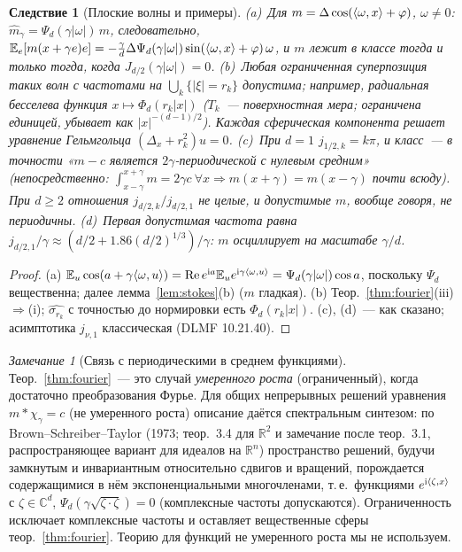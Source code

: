 \documentclass[11pt,a4paper]{article}
\numberwithin{equation}{section}
\newtheorem{corollary}[theorem]{Следствие}
\theoremstyle{definition}
\theoremstyle{remark}
\newtheorem{remark}[theorem]{Замечание}
\newcommand{\E}{\mathbb E}\newcommand{\R}{\mathbb R}\newcommand{\N}{\mathbb N}\let\Prob\relax\newcommand{\Prob}{\mathbb P}
\begin{document}
\begin{corollary}[Плоские волны и примеры]\label{cor:waves}
(a)~Для $m=\Delta\cos(\langle \omega,x\rangle+\varphi)$, $\omega\ne0$: $\hat m_\gamma=\Psi_d(\gamma|\omega|)\,m$, следовательно, $\E_e[m(x+\gamma e)e]=-\frac\gamma d\Delta\Psi_d(\gamma|\omega|)\sin(\ip\omega x+\varphi)\,\omega$, и $m$ лежит в классе тогда и только тогда, когда $J_{d/2}(\gamma|\omega|)=0$.
(b)~Любая ограниченная суперпозиция таких волн с частотами на $\bigcup_k\{|\xi|=r_k\}$ допустима; например, радиальная бесселева функция $x\mapsto\Phi_d(r_k|x|)$ ($T_k$~--- поверхностная мера; ограничена единицей, убывает как $|x|^{-(d-1)/2}$). Каждая сферическая компонента решает уравнение Гельмгольца $(\Delta_x+r_k^2)u=0$.
(c)~При $d=1$ $j_{1/2,k}=k\pi$, и класс~--- в точности «$m-c$ является $2\gamma$-периодической с нулевым средним» (непосредственно: $\int_{x-\gamma}^{x+\gamma}m=2\gamma c\ \forall x\Rightarrow m(x+\gamma)=m(x-\gamma)$ почти всюду). При $d\ge2$ отношения $j_{d/2,k}/j_{d/2,1}$ не целые, и допустимые $m$, вообще говоря, не периодичны.
(d)~Первая допустимая частота равна $j_{d/2,1}/\gamma\approx(d/2+1.86(d/2)^{1/3})/\gamma$: $m$ осциллирует на масштабе $\gamma/d$.
\end{corollary}
\begin{proof}
(a) $\E_u\cos(a+\gamma\ip\omega u)=\mathrm{Re}\,e^{\mathrm ia}\E_ue^{\mathrm i\gamma\ip\omega u}=\Psi_d(\gamma|\omega|)\cos a$, поскольку $\Psi_d$ вещественна; далее лемма~\ref{lem:stokes}(b) ($m$ гладкая). (b) Теор.~\ref{thm:fourier}(iii)$\Rightarrow$(i); $\widehat{\sigma_{r_k}}$ с точностью до нормировки есть $\Phi_d(r_k|x|)$. (c), (d)~--- как сказано; асимптотика $j_{\nu,1}$ классическая (DLMF 10.21.40).
\end{proof}

\begin{remark}[Связь с периодическими в среднем функциями]
Теор.~\ref{thm:fourier}~--- это случай \emph{умеренного роста} (ограниченный), когда достаточно преобразования Фурье. Для общих непрерывных решений уравнения $m*\chi_\gamma=c$ (не умеренного роста) описание даётся спектральным синтезом: по Brown--Schreiber--Taylor (1973; теор.~3.4 для $\R^2$ и замечание после теор.~3.1, распространяющее вариант для идеалов на $\R^n$) пространство решений, будучи замкнутым и инвариантным относительно сдвигов и вращений, порождается содержащимися в нём экспоненциальными многочленами, т.\,е.\ функциями $e^{\mathrm i\langle \zeta,x\rangle}$ с $\zeta\in\mathbb C^d$, $\Psi_d(\gamma\sqrt{\zeta\cdot\zeta})=0$ (комплексные частоты допускаются). Ограниченность исключает комплексные частоты и оставляет вещественные сферы теор.~\ref{thm:fourier}. Теорию для функций не умеренного роста мы не используем.
\end{remark}
\end{document}
